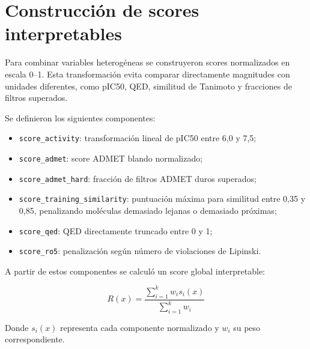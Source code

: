 \documentclass[IB]{TFUOC}%
\begin{document}
\section{Construcción de scores interpretables}

Para combinar variables heterogéneas se construyeron scores normalizados en escala 0--1. Esta transformación evita comparar directamente magnitudes con unidades diferentes, como pIC50, QED, similitud de Tanimoto y fracciones de filtros superados.

Se definieron los siguientes componentes:

\begin{itemize}
    \item \texttt{score\_activity}: transformación lineal de pIC50 entre 6,0 y 7,5;
    \item \texttt{score\_admet}: score ADMET blando normalizado;
    \item \texttt{score\_admet\_hard}: fracción de filtros ADMET duros superados;
    \item \texttt{score\_training\_similarity}: puntuación máxima para similitud entre 0,35 y 0,85, penalizando moléculas demasiado lejanas o demasiado próximas;
    \item \texttt{score\_qed}: QED directamente truncado entre 0 y 1;
    \item \texttt{score\_ro5}: penalización según número de violaciones de Lipinski.
\end{itemize}

A partir de estos componentes se calculó un score global interpretable:

\begin{equation}
    R(x) = \frac{\sum_{i=1}^{k} w_i s_i(x)}{\sum_{i=1}^{k} w_i}
\end{equation}

Donde $s_i(x)$ representa cada componente normalizado y $w_i$ su peso correspondiente.
\end{document}
